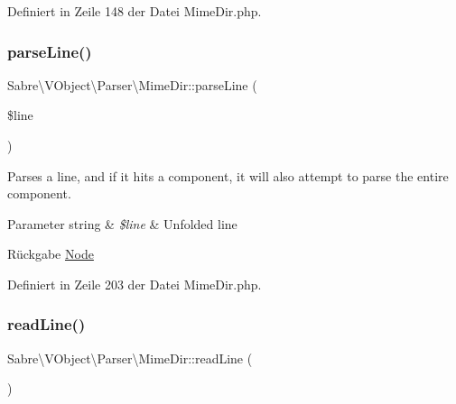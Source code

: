 Definiert in Zeile 148 der Datei Mime\+Dir.\+php.

\mbox{\label{class_sabre_1_1_v_object_1_1_parser_1_1_mime_dir_a4b695104272796834e37bb428c0ad629}} 
\subsubsection{\texorpdfstring{parse\+Line()}{parseLine()}}
{\footnotesize\ttfamily Sabre\textbackslash{}\+V\+Object\textbackslash{}\+Parser\textbackslash{}\+Mime\+Dir\+::parse\+Line (\begin{DoxyParamCaption}\item[{}]{\$line }\end{DoxyParamCaption})\hspace{0.3cm}{\ttfamily [protected]}}

Parses a line, and if it hits a component, it will also attempt to parse the entire component.


\begin{DoxyParams}[1]{Parameter}
string & {\em \$line} & Unfolded line\\
\hline
\end{DoxyParams}
\begin{DoxyReturn}{Rückgabe}
\mbox{\hyperlink{class_sabre_1_1_v_object_1_1_node}{Node}} 
\end{DoxyReturn}


Definiert in Zeile 203 der Datei Mime\+Dir.\+php.

\mbox{\label{class_sabre_1_1_v_object_1_1_parser_1_1_mime_dir_ad6b4cd149ad202f7aaa162844d484665}} 
\subsubsection{\texorpdfstring{read\+Line()}{readLine()}}
{\footnotesize\ttfamily Sabre\textbackslash{}\+V\+Object\textbackslash{}\+Parser\textbackslash{}\+Mime\+Dir\+::read\+Line (\begin{DoxyParamCaption}{ }\end{DoxyParamCaption})\hspace{0.3cm}{\ttfamily [protected]}}

